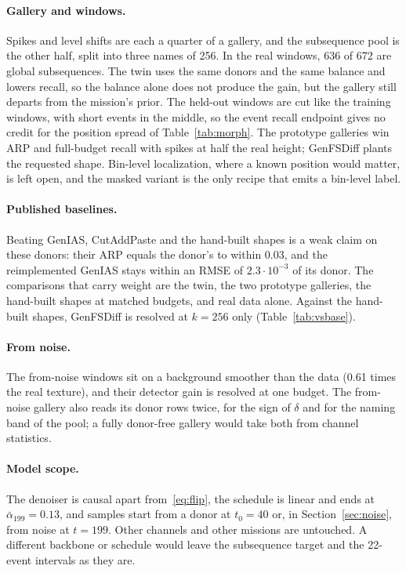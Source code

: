 \documentclass[11pt,a4paper]{article}
\newcommand{\abar}{\bar\alpha}
\begin{document}
\paragraph{Gallery and windows.}
Spikes and level shifts are each a quarter of a gallery, and the subsequence
pool is the other half, split into three names of 256. In the real windows,
636 of 672 are global subsequences. The twin uses the same donors and the same
balance and lowers recall, so the balance alone does not produce the gain, but
the gallery still departs from the mission's prior. The held-out windows are
cut like the training windows, with short events in the middle, so the event
recall endpoint gives no credit for the position spread of
Table~\ref{tab:morph}. The prototype galleries win ARP and full-budget recall
with spikes at half the real height; GenFSDiff plants the requested shape.
Bin-level localization, where a known position would matter, is left open, and
the masked variant is the only recipe that emits a bin-level label.

\paragraph{Published baselines.}
Beating GenIAS, CutAddPaste and the hand-built shapes is a weak claim on these
donors: their ARP equals the donor's to within 0.03, and the reimplemented
GenIAS stays within an RMSE of $2.3 \cdot 10^{-3}$ of its donor. The
comparisons that carry weight are the twin, the two prototype galleries, the
hand-built shapes at matched budgets, and real data alone. Against the
hand-built shapes, GenFSDiff is resolved at $k = 256$ only
(Table~\ref{tab:vsbase}).

\paragraph{From noise.}
The from-noise windows sit on a background smoother than the data (0.61
times the real texture), and their detector gain is resolved at one budget.
The from-noise gallery also reads its donor rows twice, for the sign of
$\delta$ and for the naming band of the pool; a fully donor-free gallery would
take both from channel statistics.

\paragraph{Model scope.}
The denoiser is causal apart from~\eqref{eq:flip}, the schedule is linear and
ends at $\abar_{199} = 0.13$, and samples start from a donor at $t_{0} = 40$
or, in Section~\ref{sec:noise}, from noise at $t = 199$. Other channels and
other missions are untouched. A different
backbone or schedule would leave the subsequence target and the 22-event
intervals as they are.
\end{document}
